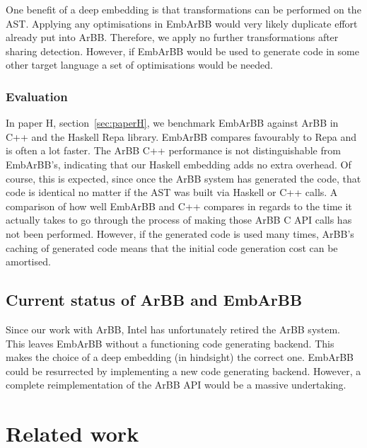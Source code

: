 \documentclass[a4paper]{book}
\begin{document}
One benefit of a deep embedding is that transformations can be performed on the AST. Applying 
any optimisations in EmbArBB would very likely duplicate effort already put into ArBB. 
Therefore, we apply no further transformations after sharing detection. However, if EmbArBB 
would be used to generate code in some other target language a set of optimisations 
would be needed.  

\subsubsection{Evaluation} 

In paper H, section~\ref{sec:paperH}, we benchmark EmbArBB against ArBB in C++ and the Haskell 
Repa library. EmbArBB compares favourably to Repa and is often a lot faster. The ArBB 
C++ performance is not distinguishable from EmbArBB's, indicating that our Haskell embedding 
adds no extra overhead. Of course, this is expected, since once the ArBB system has generated 
the code, that code is identical no matter if the AST was built via Haskell or C++ calls. 
A comparison of how well EmbArBB and C++ compares in regards to the time it actually 
takes to go through the process of making those ArBB C API calls has not been performed. 
However, if the generated code is used many times, ArBB's caching of generated code means 
that the initial code generation cost can be amortised. 

\subsection{Current status of ArBB and EmbArBB} 

Since our work with ArBB, Intel has unfortunately retired the ArBB system. This 
leaves EmbArBB without a functioning code generating backend. This makes the choice of a
deep embedding (in hindsight) the correct one. EmbArBB could be resurrected by implementing 
a new code generating backend. However, a complete reimplementation of the ArBB API would be 
a massive undertaking.


%
%
\section{Related work} 
\label{sec:relatedwork}
\FloatBarrier
\end{document}
